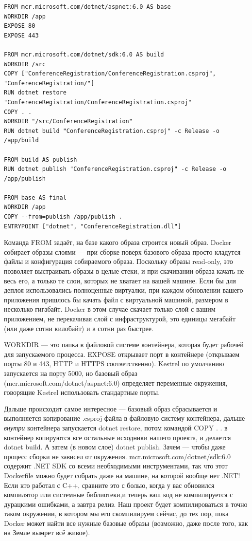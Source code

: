 \documentclass[a5paper]{article}
\begin{document}
\begin{verbatim}
FROM mcr.microsoft.com/dotnet/aspnet:6.0 AS base
WORKDIR /app
EXPOSE 80
EXPOSE 443

FROM mcr.microsoft.com/dotnet/sdk:6.0 AS build
WORKDIR /src
COPY ["ConferenceRegistration/ConferenceRegistration.csproj", "ConferenceRegistration/"]
RUN dotnet restore "ConferenceRegistration/ConferenceRegistration.csproj"
COPY . .
WORKDIR "/src/ConferenceRegistration"
RUN dotnet build "ConferenceRegistration.csproj" -c Release -o /app/build

FROM build AS publish
RUN dotnet publish "ConferenceRegistration.csproj" -c Release -o /app/publish

FROM base AS final
WORKDIR /app
COPY --from=publish /app/publish .
ENTRYPOINT ["dotnet", "ConferenceRegistration.dll"]
\end{verbatim}

Команда FROM задаёт, на базе какого образа строится новый образ. Docker собирает образы слоями --- при сборке поверх базового образа просто кладутся файлы и конфигурация собираемого образа. Поскольку образы read-only, это позволяет выстраивать образы в целые стеки, и при скачивании образа качать не весь его, а только те слои, которых не хватает на вашей машине. Если бы для деплоя использовались полноценные виртуалки, при каждом обновлении вашего приложения пришлось бы качать файл с виртуальной машиной, размером в несколько гигабайт. Docker в этом случае скачает только слой с вашим приложением, не перекачивая слой с инфраструктурой, это единицы мегабайт (или даже сотни килобайт) и в сотни раз быстрее.

WORKDIR --- это папка в файловой системе контейнера, которая будет рабочей для запускаемого процесса. EXPOSE открывает порт в контейнере (открываем порты 80 и 443, HTTP и HTTPS соответственно). Kestrel по умолчанию запускается на порту 5000, но базовый образ (mcr.microsoft.com/dotnet/aspnet:6.0) определяет переменные окружения, говорящие Kestrel использовать стандартные порты.

Дальше происходит самое интересное --- базовый образ сбрасывается и выполняется копирование .csproj-файла в файловую систему контейнера, дальше \emph{внутри} контейнера запускается dotnet restore, потом командой COPY . . в контейнер копируются все остальные исходники нашего проекта, и делается dotnet build. А затем (в новом слое) dotnet publish. Зачем --- чтобы даже процесс сборки не зависел от окружения. mcr.microsoft.com/dotnet/sdk:6.0 содержит .NET SDK со всеми необходимыми инструментами, так что этот Dockerfile можно будет собрать даже на машине, на которой вообще нет .NET! Если кто работал с C++, сравните это с болью, когда у вас обновился компилятор или системные библиотеки,и теперь ваш код не компилируется с дурацкими ошибками, а завтра релиз. Наш проект будет компилироваться в точно таком окружении, в котором мы его скомпилируем сейчас, до тех пор, пока Docker может найти все нужные базовые образы (возможно, даже после того, как на Земле вымрет всё живое).
\end{document}
